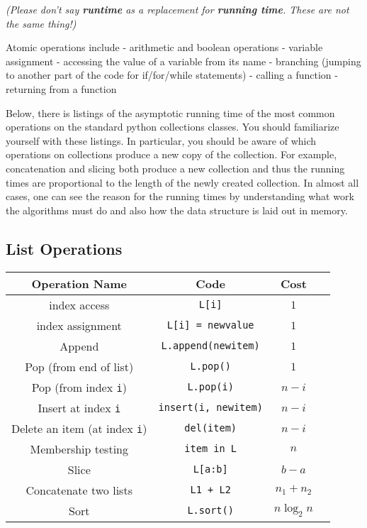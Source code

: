 \emph{(Please don't say \textbf{runtime} as a replacement for \textbf{running time}.  These are not the same thing!)}


Atomic operations include
 - arithmetic and boolean operations
 - variable assignment
 - accessing the value of a variable from its name
 - branching (jumping to another part of the code for if/for/while statements)
 - calling a function
 - returning from a function


Below, there is listings of the asymptotic running time of the most common operations on the standard python collections classes.
You should familiarize yourself with these listings.
In particular, you should be aware of which operations on collections produce a new copy of the collection.
For example, concatenation and slicing both produce a new collection and thus the running times are proportional to the length of the newly created collection.
In almost all cases, one can see the reason for the running times by understanding what work the algorithms must do and also how the data structure is laid out in memory.

\subsection{List Operations}

\begin{tabular}{c c c c}

\hline


Operation Name & 
Code & 
Cost & 
\\
\hline



index access &
\texttt{L[i]} &
$1$ &
\\

index assignment &
\texttt{L[i] = newvalue} &
$1$ &
\\

Append &
\texttt{L.append(newitem)} &
$1$ &
\\

Pop (from end of list) &
\texttt{L.pop()} &
$1$ &
\\

Pop (from index \texttt{i}) &
\texttt{L.pop(i)} &
$n - i$ &
\\

Insert at index \texttt{i} &
\texttt{insert(i, newitem)} &
$n-i$ &
\\

Delete an item (at index \texttt{i}) &
\texttt{del(item)} &
$n - i$ &
\\

Membership testing &
\texttt{item in L} &
$n$ &
\\

Slice &
\texttt{L[a:b]} &
$b-a$ &
\\

Concatenate two lists &
\texttt{L1 + L2} &
$n_1 + n_2$ &
\\

Sort &
\texttt{L.sort()} &
$n \log_2 n$ &
\\
\hline
\end{tabular}

